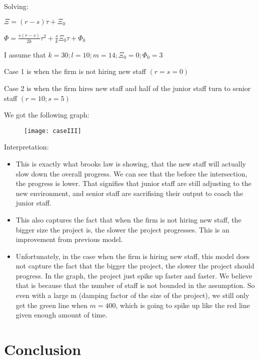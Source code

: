 \documentclass{article}
\newenvironment{atomize}
    {\begin{list} {} {
            \setlength\itemindent{0pt}
            \setlength\leftmargin{10pt}
            \setlength\labelwidth{0pt}
    }}
    {\end{list}}
\begin{document}
\begin{atomize}
\begin{atomize}
					\item Solving: 
							\begin{atomize}
								\item $\Xi = (r-s)\tau + \Xi_{0}$
								\item $\Phi = \frac{s(r-s)}{2k}\tau^{2} + \frac{s}{k}\Xi_{0}\tau + \Phi_{0}$
								\item I assume that $k = 30; l = 10; m = 14; \Xi_{0} = 0; \Phi_{0} = 3$ 
								\item Case 1 is when the firm is not hiring new staff $(r = s =
								0)$
								\item Case 2 is when the firm hires new staff and half of the
								junior staff turn to senior staff $(r=10; s=5)$
                \item We got the following graph:
							\end{atomize}
 		       \item 
    		      \begin{figure}[H]
        	    \centering
          	  \texttt{[image: caseIII]}
         	 \end{figure}

          \item Interpretation:
            \begin{itemize}
							\item This is exactly what brooks law is showing, that the new
							staff will actually slow down the overall progress. We can see
							that the before the intersection, the progress is lower. That
							signifies that junior staff are still adjusting to the new
							environment, and senior staff are sacrifising their output to
							coach the junior staff. 

							\item This also captures the fact that when the firm is not hiring
							new staff, the bigger size the project is, the slower the project
							progresses. This is an improvement from previous model.

							\item Unfortunately, in the case when the firm is hiring new
							staff, this model does not capture the fact that the bigger the
							project, the slower the project should progress. In the graph, the
							project just spike up faster and faster. We believe that is
							because that the number of staff is not bounded in the assumption.
							So even with a large m (damping factor of the size of the
							project), we still only get the green line when $m=400$, which is
							going to spike up like the red line given enough amount of time. 

            \end{itemize}


				\end{atomize}
			
		\end{atomize}

  \section*{Conclusion}
\end{document}
